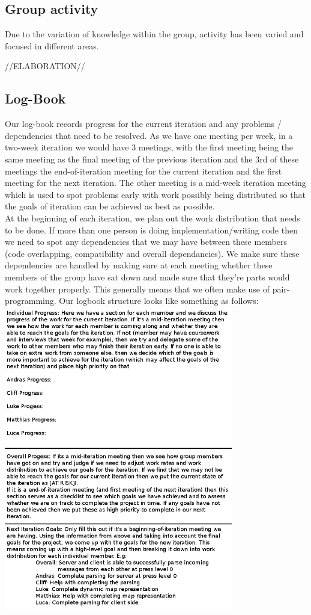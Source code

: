 \documentclass[11pt]{article}
\begin{document}
\subsection{Group activity}
Due to the variation of knowledge within the group, activity has been varied
and focused in different areas. 

//ELABORATION//

\subsection{Log-Book}
Our log-book records progress for the current iteration and any problems / 
dependencies that need to be resolved. As we have one meeting per week, in a 
two-week iteration we would have 3 meetings, with the first meeting being the 
same meeting as the final meeting of the previous iteration and the 3rd of these
meetings the end-of-iteration meeting for the current iteration and the first 
meeting for the next iteration. The other meeting is a mid-week iteration 
meeting which is used to spot problems early with work possibly being 
distributed so that the goals of iteration can be achieved as best as possible. 
\\
At the beginning of each iteration, we plan out the work distribution that needs
to be done. If more than one person is doing implementation/writing code then we
need to spot any dependencies that we may have between these members (code 
overlapping, compatibility and overall dependancies). We make sure these 
dependencies are handled by making sure at each meeting whether these members
of the group have sat down and made sure that they're parts would work together
properly. This generally means that we often make use of pair-programming. Our 
logbook structure looks like something as follows:
\\ 
\includegraphics[width=100mm]{logbooktemplate.png}
\end{document}
